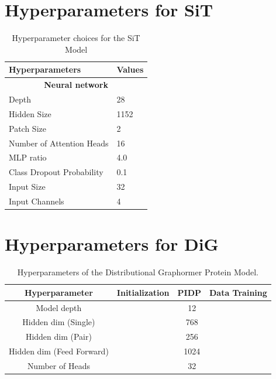 \documentclass{article}
\theoremstyle{plain}
\theoremstyle{definition}
\theoremstyle{remark}
\begin{document}
\newpage
\section{Hyperparameters for SiT}
\label{app:sit}

 \begin{table}[!htbp]
 \label{tab:hparam:sit}
\centering
\caption{Hyperparameter choices for the SiT Model}
\setlength{\tabcolsep}{16mm
}
\begin{tabular}{ll}
\toprule[1.2pt]


\textbf{Hyperparameters} & \textbf{Values}\\ 
 \midrule[0.5pt]
 \multicolumn{2}{c}{\textbf{Neural network}} \\
 \midrule[0.5pt]
Depth & 28 \\
Hidden Size & 1152 \\
Patch Size & 2 \\
Number of Attention Heads & 16 \\
MLP ratio & 4.0 \\
Class Dropout Probability &  0.1 \\
Input Size &  32 \\
Input Channels & 4 \\

\bottomrule[1.2pt]
\end{tabular}

\label{tab:hyperparameters_SiT}
\end{table}



\section{Hyperparameters for DiG}
\label{app:dig}

\begin{table}[h]
    \centering
    \caption{Hyperparameters of the Distributional Graphormer Protein Model.}
    \begin{tabular}{c|c|c|c}
        \toprule
         Hyperparameter & Initialization & PIDP & Data Training \\
         \midrule
         Model depth & \multicolumn{3}{c}{12} \\
         Hidden dim (Single) & \multicolumn{3}{c}{768}\\
         Hidden dim (Pair) & \multicolumn{3}{c}{256} \\
         Hidden dim (Feed Forward) & \multicolumn{3}{c}{1024} \\
         Number of Heads & \multicolumn{3}{c}{32} \\
         \bottomrule
    \end{tabular}
    \label{tab:protein_hps}
\end{table}
\end{document}
